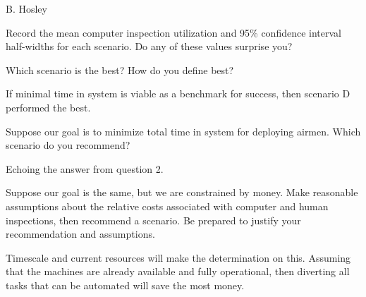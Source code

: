 \documentclass[answers]{exam}
\begin{document}
\hspace{\fill} {\large B. Hosley}
\bigskip

\begin{questions}

\question 
Record the mean computer inspection utilization and 95\% confidence interval half-widths for each scenario. Do any of these values surprise you?
\begin{solution}
	
	
	
	
\end{solution}

\question 
Which scenario is the best? How do you define best?
\begin{solution}
	If minimal time in system is viable as a benchmark for success, then scenario D performed the best.
\end{solution}

\question 
Suppose our goal is to minimize total time in system for deploying airmen. Which scenario do you recommend?
\begin{solution}
	Echoing the answer from question 2.
\end{solution}

\question 
Suppose our goal is the same, but we are constrained by money. Make reasonable assumptions about the relative costs associated with computer and human inspections, then recommend a scenario. Be prepared to justify your recommendation and assumptions.
\begin{solution}
	Timescale and current resources will make the determination on this.
	Assuming that the machines are already available and fully operational, 
	then diverting all tasks that can be automated will save the most money.
\end{solution}

\end{questions}
\end{document}
